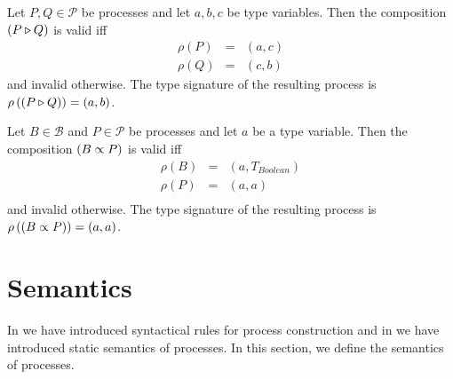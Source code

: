 \begin{definition}
\label{def:static_sequence}
Let $P, Q \in \mathcal{P}$ be processes and let $a, b, c$ be type variables. Then the composition $\left( P \triangleright Q \right)$ is valid iff
\begin{eqnarray*}
  \rho \left( P \right) & = & \left( a, c \right) \\
  \rho \left( Q \right) & = & \left( c, b \right)
\end{eqnarray*}
and invalid otherwise. The type signature of the resulting process is $\rho \left( \left( P \triangleright Q \right) \right) = \left( a, b \right)$.

\hfill\qedsymbol
\end{definition}


\begin{definition}
\label{def:static_repetition}
Let $B \in \mathcal{B}$ and $P \in \mathcal{P}$ be processes and let $a$ be a type variable. Then the composition $\left( B \propto P \right)$ is valid iff
\begin{eqnarray*}
  \rho \left( B \right) & = & \left( a, T_{Boolean} \right) \\
  \rho \left( P \right) & = & \left( a, a \right) \\
\end{eqnarray*}
and invalid otherwise. The type signature of the resulting process is $\rho \left( \left( B \propto P \right) \right) = \left( a, a \right)$.

\hfill\qedsymbol
\end{definition}




\clearpage
\section{Semantics}
\label{chp:semantics}
In  we have introduced syntactical rules for process construction and in  we have introduced static semantics of processes. In this section, we define the semantics of processes. 


